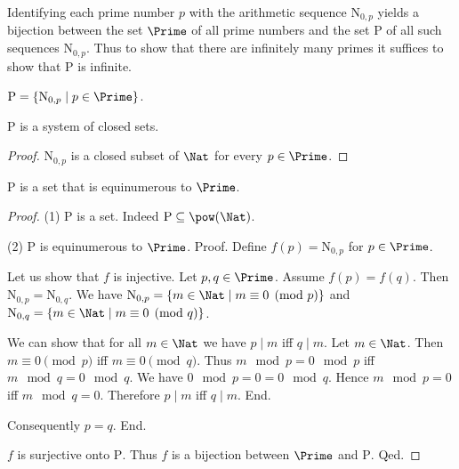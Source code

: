 \documentclass{article}
\newcommand{\N}{\mathrm{N}}
\newcommand{\Ps}{\mathrm{P}}
\begin{document}
  Identifying each prime number $p$ with the arithmetic sequence $\N_{0, p}$
  yields a bijection between the set $\Prime$ of all prime numbers and the set
  $\Ps$ of all such sequences $\N_{0, p}$.
  Thus to show that there are infinitely many primes it suffices to show that
  $\Ps$ is infinite.

  \begin{forthel}
    \begin{definition}
      $\Ps = \{ \N_{0, p} \mid p \in \Prime \}$.
    \end{definition}

    \begin{lemma}
      $\Ps$ is a system of closed sets.
    \end{lemma}
    \begin{proof}
      $\N_{0, p}$ is a closed subset of $\Nat$ for every $p \in \Prime$.
    \end{proof}

    \begin{lemma}
      $\Ps$ is a set that is equinumerous to $\Prime$.
    \end{lemma}
    \begin{proof}
      (1) $\Ps$ is a set.
      Indeed $\Ps \subseteq \pow(\Nat)$.

      (2) $\Ps$ is equinumerous to $\Prime$. \newline
      Proof.
        Define $f(p) = \N_{0,p}$ for $p \in \Prime$.

        Let us show that $f$ is injective.
          Let $p, q \in \Prime$.
          Assume $f(p) = f(q)$.
          Then $\N_{0, p} = \N_{0, q}$.
          We have $\N_{0, p} = \{ m \in \Nat \mid m \equiv 0 \pmod{p} \}$ and
          $\N_{0, q} = \{ m \in \Nat \mid m \equiv 0 \pmod{q} \}$.

          We can show that for all $m \in \Nat$ we have $p \mid m$ iff $q \mid m$.
            Let $m \in \Nat$.
            Then $m \equiv 0 \pmod{p}$ iff $m \equiv 0 \pmod{q}$.
            Thus $m \mod p = 0 \mod p$ iff $m \mod q = 0 \mod q$.
            We have $0 \mod p = 0 = 0 \mod q$.
            Hence $m \mod p = 0$ iff $m \mod q = 0$.
            Therefore $p \mid m$ iff $q \mid m$.
          End.

          Consequently $p = q$.
        End.

        $f$ is surjective onto $\Ps$.
        Thus $f$ is a bijection between $\Prime$ and $\Ps$.
      Qed.
    \end{proof}


\end{forthel}
\end{document}
